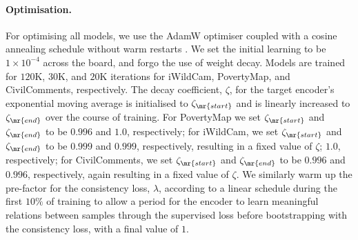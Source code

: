 \paragraph{Optimisation.} For optimising all models, we use the AdamW optimiser
\citep{loshchilov2018decoupled} coupled with a cosine annealing schedule without warm restarts
\citep{DBLP:conf/iclr/LoshchilovH17}.
%
We set the initial learning to be $1 \times 10^{-4}$ across the board, and forgo the use of weight
decay. 
%
Models are trained for $120$K, $30$K, and $20$K iterations for iWildCam, PovertyMap, and
CivilComments, respectively.
%
The decay coefficient, $\zeta$, for the target encoder's exponential moving average is initialised
to $\zeta_{\mr{start}}$ and is linearly increased to $\zeta_{\mr{end}}$ over the course of
training. For PovertyMap we set $\zeta_{\mr{start}}$ and $\zeta_{\mr{end}}$ to be $0.996$ and
$1.0$, respectively; for iWildCam, we set $\zeta_{\mr{start}}$ and $\zeta_{\mr{end}}$ to be $0.999$
and $0.999$, respectively, resulting in a fixed value of $\zeta$; $1.0$, respectively; for
CivilComments, we set $\zeta_{\mr{start}}$ and $\zeta_{\mr{end}}$ to be $0.996$ and $0.996$,
respectively, again resulting in a fixed value of $\zeta$. 
We similarly warm up the pre-factor for the consistency loss, $\lambda$, according to a linear
schedule during the first $10\%$ of training to allow a period for the encoder to learn meaningful
relations between samples through the supervised loss before bootstrapping with the consistency
loss, with a final value of $1$.

